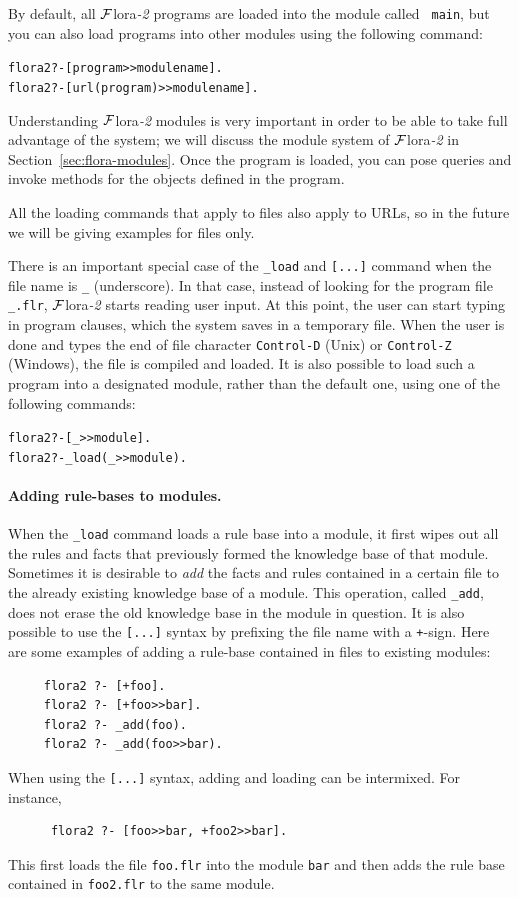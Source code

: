 \documentclass[11pt]{article}
\newcommand{\FLORA}{{\mbox{\sc ${\cal F}${lora}\rm\emph{-2}}}\xspace}
\begin{document}
By default, all \FLORA programs are loaded into the module called {\tt
  main}, but you can also load programs into other modules using the following
command:
\begin{alltt}
  flora2 ?-  [program>>modulename].
  flora2 ?-  [url(program)>>modulename].
\end{alltt}
Understanding \FLORA modules is very important in order to be able to take
full advantage of the system; we will discuss the module system of \FLORA
in Section~\ref{sec:flora-modules}.  Once the program is loaded, you can
pose queries and invoke methods for the objects defined in the program.

All the loading commands that apply to files also apply to URLs, so in the
future we will be giving examples for files only.

There is an important special case of the {\tt \_load} and {\tt [...]}
command when the file name is {\tt \_} (underscore). In that case, instead
of looking for the program file {\tt \_.flr}, \FLORA starts reading user
input. At this point, the user can start typing in program clauses, which
the system saves in a temporary file. When the user is done and types the
end of file character {\tt Control-D} (Unix) or {\tt Control-Z} (Windows),
the file is compiled and loaded. It is also possible to load such a program
into a designated module, rather than the default one, using one of the
following commands:
\begin{alltt}
  flora2 ?- [_>>module].
  flora2 ?- _load(_>>module).
\end{alltt}

\paragraph{Adding rule-bases to modules.}
When the {\tt \_load} command loads a rule base into a module, it first wipes
out all the rules and facts that previously formed the knowledge base of
that module. Sometimes it is desirable to \emph{add} the facts and
rules contained in a certain file to the already existing knowledge base of
a module. This operation, called {\tt \_add}, does not erase the old
knowledge base in the module in question.  It is also possible to use the
{\tt [...]} syntax by prefixing the file name with a {\tt +}-sign. Here are
some examples of adding a rule-base contained in files to existing
modules:
\index{\tt [file]}
\begin{verbatim}
     flora2 ?- [+foo].
     flora2 ?- [+foo>>bar].
     flora2 ?- _add(foo).
     flora2 ?- _add(foo>>bar).
\end{verbatim}
When using the {\tt [...]} syntax, adding and loading can be
intermixed. For instance, 
\begin{verbatim}
      flora2 ?- [foo>>bar, +foo2>>bar].
\end{verbatim}
This first loads the file {\tt foo.flr} into the module {\tt bar} and then
adds the rule base contained in {\tt foo2.flr} to the same module.
\end{document}
